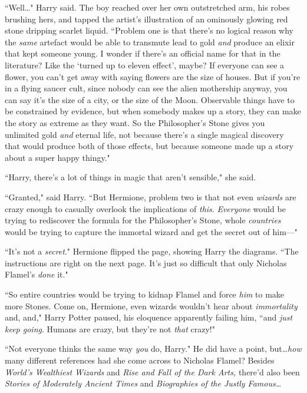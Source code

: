 ``Well…" Harry said. The boy reached over her own outstretched arm, his robes brushing hers, and tapped the artist's illustration of an ominously glowing red stone dripping scarlet liquid. ``Problem one is that there's no logical reason why the \emph{same} artefact would be able to transmute lead to gold \emph{and} produce an elixir that kept someone young. I wonder if there's an official name for that in the literature? Like the `turned up to eleven effect', maybe? If everyone can see a flower, you can't get away with saying flowers are the size of houses. But if you're in a flying saucer cult, since nobody can see the alien mothership anyway, you can say it's the size of a city, or the size of the Moon. Observable things have to be constrained by evidence, but when somebody makes up a story, they can make the story as extreme as they want. So the Philosopher's Stone gives you unlimited gold \emph{and} eternal life, not because there's a single magical discovery that would produce both of those effects, but because someone made up a story about a super happy thingy."

``Harry, there's a lot of things in magic that aren't sensible," she said.

``Granted," said Harry. ``But Hermione, problem two is that not even \emph{wizards} are crazy enough to casually overlook the implications of \emph{this}. \emph{Everyone} would be trying to rediscover the formula for the Philosopher's Stone, whole \emph{countries} would be trying to capture the immortal wizard and get the secret out of him—"

``It's not a \emph{secret}." Hermione flipped the page, showing Harry the diagrams. ``The instructions are right on the next page. It's just so difficult that only Nicholas Flamel's \emph{done} it."

``So entire countries would be trying to kidnap Flamel and force \emph{him} to make more Stones. Come on, Hermione, even wizards wouldn't hear about \emph{immortality} and, and," Harry Potter paused, his eloquence apparently failing him, ``and \emph{just keep going}. Humans are crazy, but they're not \emph{that} crazy!"

``Not everyone thinks the same way \emph{you} do, Harry." He did have a point, but…\emph{how} many different references had she come across to Nicholas Flamel? Besides \emph{World's Wealthiest Wizards} and \emph{Rise and Fall of the Dark Arts,} there'd also been \emph{Stories of Moderately Ancient Times} and \emph{Biographies of the Justly Famous…}

